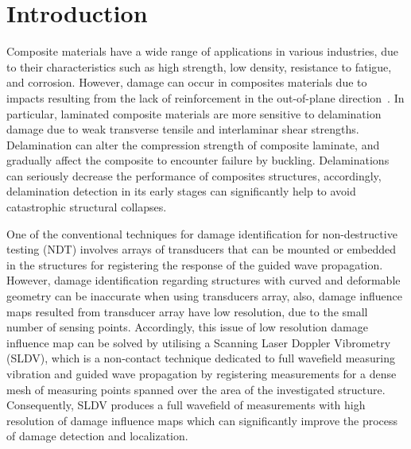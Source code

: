 \documentclass[preprint,9pt]{elsarticle}
\begin{document}
	\section{Introduction}
	Composite materials have a wide range of applications in various industries, due to their characteristics such as high strength, low density, resistance to fatigue, and corrosion.  
	However, damage can occur in composites materials due to impacts resulting from the lack of reinforcement in the out-of-plane direction~\cite{Francesconi2019}.
	In particular, laminated composite materials are more sensitive to delamination damage due to weak transverse tensile and interlaminar shear strengths.
	Delamination can alter the compression strength of composite laminate, and gradually affect the composite to encounter failure by buckling. 
	Delaminations can seriously decrease the performance of composites structures, accordingly, delamination detection in its early stages can significantly help to avoid catastrophic structural collapses.
	
	One of the conventional techniques for damage identification for non-destructive testing (NDT) involves arrays of transducers that can be mounted or embedded in the structures for registering the response of the guided wave propagation.
	However, damage identification regarding structures with curved and deformable geometry can be inaccurate when using transducers array, also, damage influence maps resulted from transducer array have low resolution, due to the small number of sensing points. 
    Accordingly, this issue of low resolution damage influence map can be solved by utilising a Scanning Laser Doppler Vibrometry (SLDV), which is a non-contact technique dedicated to full wavefield measuring vibration and guided wave propagation by registering measurements for a dense mesh of measuring points spanned over the area of the investigated structure.
    Consequently, SLDV produces a full wavefield of measurements with high resolution of damage influence maps which can significantly improve the process of damage detection and localization. 
    
\end{document}
